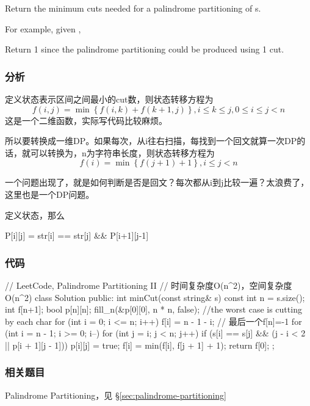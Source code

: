 Return the minimum cuts needed for a palindrome partitioning of s.

For example, given ,

Return 1 since the palindrome partitioning \code{["aa","b"]} could be produced using 1 cut.


\subsubsection{分析}
定义状态表示区间\fn{[i,j]}之间最小的cut数，则状态转移方程为 
$$
f(i,j)=\min\left\{f(i,k)+f(k+1,j)\right\}, i \leq k \leq j, 0 \leq i \leq j<n
$$
这是一个二维函数，实际写代码比较麻烦。
 
所以要转换成一维DP。如果每次，从i往右扫描，每找到一个回文就算一次DP的话，就可以转换为，n为字符串长度，则状态转移方程为
$$
f(i)=\min\left\{f(j+1)+1\right\}, i \leq j<n
$$

一个问题出现了，就是如何判断\fn{[i,j]}是否是回文？每次都从i到j比较一遍？太浪费了，这里也是一个DP问题。

定义状态，那么
\begin{Code}
P[i][j] = str[i] == str[j] && P[i+1][j-1]
\end{Code}


\subsubsection{代码}
\begin{Code}
// LeetCode, Palindrome Partitioning II
// 时间复杂度O(n^2)，空间复杂度O(n^2)
class Solution {
public:
    int minCut(const string& s) {
        const int n = s.size();
        int f[n+1];
        bool p[n][n];
        fill_n(&p[0][0], n * n, false);
        //the worst case is cutting by each char
        for (int i = 0; i <= n; i++)
            f[i] = n - 1 - i; // 最后一个f[n]=-1
        for (int i = n - 1; i >= 0; i--) {
            for (int j = i; j < n; j++) {
                if (s[i] == s[j] && (j - i < 2 || p[i + 1][j - 1])) {
                    p[i][j] = true;
                    f[i] = min(f[i], f[j + 1] + 1);
                }
            }
        }
        return f[0];
    }
};
\end{Code}


\subsubsection{相关题目}
\begindot
\item Palindrome Partitioning，见 \S \ref{sec:palindrome-partitioning}
\myenddot


